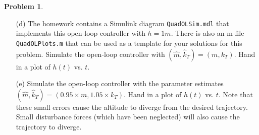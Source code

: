 \documentclass{article}
\theoremstyle{definition}
\newtheorem{problem}{Problem}
\newcounter{solution}
\begin{document}
\begin{problem}
\begin{enumerate}
    \begin{equation}
        u(t) = \frac{\hat{m}}{4\hat{k}_T} \left( g + \ddot{h}_{\text{des}}(t) \right)
        = \frac{\hat{m}}{4\hat{k}_T} \left( g + \frac{\bar{h}}{2} \pi^2 \cos(\pi t) \right)
    \end{equation}

    Here \( \hat{m} \) and \( \hat{k}_T \) are estimates of the quadcopter mass and thrust constant.\footnote[1]{It is important to distinguish between the true values \( (m, k_T) \) and the estimates \( (\hat{m}, \hat{k}_T) \) used by the controller. In general, the control design is performed using simplified models that are reasonably accurate but with some error relative to the ``real'' dynamics.}
 This open-loop controller is based on the pre-planned trajectory \( h_{\text{des}}(t) \) and does not use a measurement of the actual altitude. Assume the estimates are perfect: \( (\hat{m}, \hat{k}_T) = (m, k_T) \). Verify this open-loop controller causes the quadcopter altitude \( h(t) \) to follow the desired trajectory \( h_{\text{des}}(t) \).
    
    \item[(d)] The homework contains a Simulink diagram \texttt{QuadOLSim.mdl} that implements this open-loop controller with \( \bar{h} = 1m \). There is also an m-file \texttt{QuadOLPlots.m} that can be used as a template for your solutions for this problem. Simulate the open-loop controller with \( (\hat{m}, \hat{k}_T) = (m, k_T) \). Hand in a plot of \( h(t) \) vs. \( t \).
    
    \item[(e)] Simulate the open-loop controller with the parameter estimates \( (\hat{m}, \hat{k}_T) = (0.95 \times m, 1.05 \times k_T) \). Hand in a plot of \( h(t) \) vs. \( t \). Note that these small errors cause the altitude to diverge from the desired trajectory. Small disturbance forces (which have been neglected) will also cause the trajectory to diverge.
\end{enumerate}

\end{problem}
\end{document}
